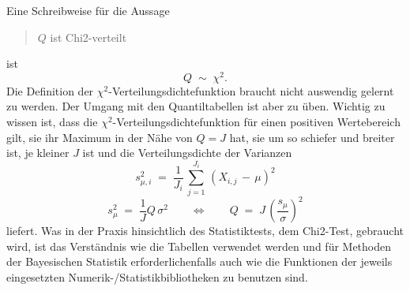 Eine Schreibweise für die Aussage
\begin{quote}
$Q$ ist Chi2-verteilt
\end{quote}
ist
\begin{equation}
Q \; \sim \; \chi^2 .
\label{Chi2verteilt}
\end{equation}
Die Definition der $\chi^2$-Verteilungsdichtefunktion braucht nicht auswendig gelernt zu 
werden. Der Umgang mit den Quantiltabellen ist aber zu üben.
Wichtig zu wissen ist, dass die $\chi^2$-Verteilungs\-dichte\-funktion für
einen positiven Wertebereich gilt, sie ihr Maximum in der Nähe von $Q = J$ hat, sie um so
schiefer und breiter ist, je kleiner $J$ ist und die Verteilungsdichte der Varianzen
\begin{equation}
s_{\mu,i}^2 \; = \; \frac{1}{J_i} \, \sum_{j=1}^{J_i} \, (X_{i,j} \, - \, \mu)^2
\end{equation}
\begin{equation}
s_{\mu}^2 \; = \; \frac{1}{J} Q \, \sigma^2  \qquad \Leftrightarrow \qquad 
Q \; = \; J \, \left( \frac{s_{\mu}}{\sigma} \right)^2
\label{s2Q}
\end{equation}
liefert. Was in der Praxis hinsichtlich des Statistiktests, dem Chi2-Test, gebraucht wird,
ist das Verständnis wie die Tabellen verwendet werden
und für Methoden der Bayesischen Statistik erforderlichenfalls auch wie die
Funktionen der jeweils eingesetzten Numerik-/Statistik\-biblio\-theken zu benutzen sind. 

